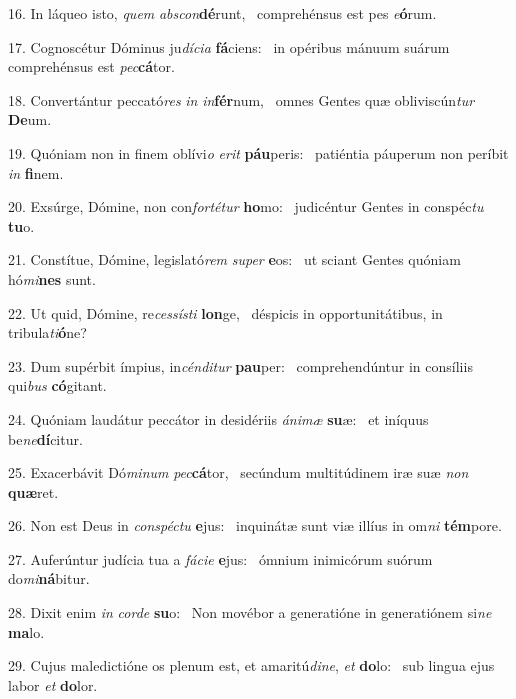 16. In láqueo isto, \textit{quem} \textit{abs}\textit{con}\textbf{dé}runt, \ast\  comprehénsus est pes \textit{e}\textbf{ó}rum.\

17. Cognoscétur Dóminus ju\textit{dí}\textit{ci}\textit{a} \textbf{fá}ciens: \ast\  in opéribus mánuum suárum comprehénsus est \textit{pec}\textbf{cá}tor.\

18. Convertántur peccató\textit{res} \textit{in} \textit{in}\textbf{fér}num, \ast\  omnes Gentes quæ obliviscún\textit{tur} \textbf{De}um.\

19. Quóniam non in finem oblívi\textit{o} \textit{e}\textit{rit} \textbf{páu}peris: \ast\  patiéntia páuperum non períbit \textit{in} \textbf{fi}nem.\

20. Exsúrge, Dómine, non con\textit{for}\textit{té}\textit{tur} \textbf{ho}mo: \ast\  judicéntur Gentes in conspéc\textit{tu} \textbf{tu}o.\

21. Constítue, Dómine, legislató\textit{rem} \textit{su}\textit{per} \textbf{e}os: \ast\  ut sciant Gentes quóniam hó\textit{mi}\textbf{nes} sunt.\

22. Ut quid, Dómine, re\textit{ces}\textit{sís}\textit{ti} \textbf{lon}ge, \ast\  déspicis in opportunitátibus, in tribula\textit{ti}\textbf{ó}ne?\

23. Dum supérbit ímpius, in\textit{cén}\textit{di}\textit{tur} \textbf{pau}per: \ast\  comprehendúntur in consíliis qui\textit{bus} \textbf{có}gitant.\

24. Quóniam laudátur peccátor in desidériis \textit{á}\textit{ni}\textit{mæ} \textbf{su}æ: \ast\  et iníquus be\textit{ne}\textbf{dí}citur.\

25. Exacerbávit Dó\textit{mi}\textit{num} \textit{pec}\textbf{cá}tor, \ast\  secúndum multitúdinem iræ suæ \textit{non} \textbf{quæ}ret.\

26. Non est Deus in \textit{con}\textit{spéc}\textit{tu} \textbf{e}jus: \ast\  inquinátæ sunt viæ illíus in om\textit{ni} \textbf{tém}pore.\

27. Auferúntur judícia tua a \textit{fá}\textit{ci}\textit{e} \textbf{e}jus: \ast\  ómnium inimicórum suórum do\textit{mi}\textbf{ná}bitur.\

28. Dixit enim \textit{in} \textit{cor}\textit{de} \textbf{su}o: \ast\  Non movébor a generatióne in generatiónem si\textit{ne} \textbf{ma}lo.\

29. Cujus maledictióne os plenum est, et amaritú\textit{di}\textit{ne}, \textit{et} \textbf{do}lo: \ast\  sub lingua ejus labor \textit{et} \textbf{do}lor.\

